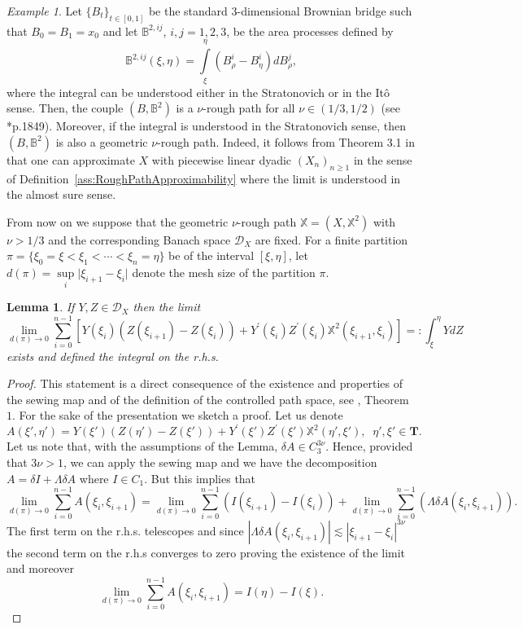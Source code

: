 \documentclass[11pt,a4paper,reqno]{amsart}%
\theoremstyle{plain}
\theoremstyle{remark}
\newtheorem{example}[theorem]{Example}
\theoremstyle{plain}
\newtheorem{lemma}[theorem]{Lemma}
\numberwithin{equation}{section}
\def\supl{\sup\limits}
\def\intl{\int\limits}
\def\supl{\mathop{\sup}\limits}
\begin{document}
\begin{example}
Let $\{B_t\}_{t\in [0,1]}$ be the standard $3$-dimensional Brownian
bridge such that $B_0=B_1=x_0$ and let $\mathbb{B}^{2,ij}$, $i,j=1,2,3$,  be the
area processes defined by
$$
\mathbb{B}^{2,ij}(\xi,\eta)=\intl_{\xi}^{\eta}(B^i_{\rho}-B^i_{\eta})dB^j_{\rho},
$$
where the integral can be understood either in the Stratonovich or in the It\^o
sense. Then, the couple $(B,\mathbb{B}^2)$ is a $\nu$-rough path for all $\nu\in(1/3,1/2)$ (see \cite{[Bess+Gub_2005]}*{p.1849}). Moreover, if the integral is understood in the Stratonovich sense,  then $(B,\mathbb{B}^2)$ is also a
geometric $\nu$-rough path.  Indeed, it follows from Theorem
3.1 in \cite{[Friz-2005]} that one can approximate $X$ with
piecewise linear dyadic $(X_n)_{n\ge 1}$ in the sense of Definition~\ref{ass:RoughPathApproximability} where the limit is understood in the almost sure sense.
\end{example}
From now on we suppose that the geometric $\nu$-rough path
$\mathbb{X}=(X,\mathbb{X}^2)$ with $\nu>1/3$ and the corresponding Banach space
$\mathcal{D}_X$ are fixed.  For a  finite
partition $\pi=\{\xi_0=\xi<\xi_1<\cdots<\xi_n=\eta\}$ be   of the interval  $[\xi,\eta]$, let  $d(\pi)=\supl_i\vert \xi_{i+1}-\xi_i\vert $ denote the mesh size of the partition $\pi$.
\begin{lemma}\label{lem:IntegralDef}
  If $Y,Z\in \mathcal{D}_X$ then the limit
\begin{equation}
\lim_{d(\pi)\to
0}\sum_{i=0}^{n-1}[Y(\xi_i)(Z(\xi_{i+1})-Z(\xi_i))+Y^\prime(\xi_i)Z^\prime(\xi_i)\mathbb{X}^2(\xi_{i+1},\xi_i)] =: \int_{\xi}^{\eta}YdZ\label{eqn:IntegralDef-1}
\end{equation}
exists and defined the integral on the r.h.s.
\end{lemma}
\begin{proof}%
This statement is a direct consequence of the existence and properties of the sewing map and of the definition of the controlled path space, see \cite{[Gubinelli-2004]}, Theorem $1$. For the sake of the presentation we sketch a proof. Let us denote
$$
A(\xi',\eta')= Y(\xi')(Z(\eta')-Z(\xi'))+Y^\prime(\xi')Z^\prime(\xi')\mathbb{X}^2(\eta',\xi'), \;\; \eta',\xi'\in\mathbf{T}.
$$
Let us note that, with the assumptions of the Lemma,  $\delta A \in C^{3\nu}_3$. Hence,  provided that $3\nu> 1$, we can apply the sewing map and we have the decomposition
$
A = \delta I +  \Lambda \delta A
$
where $I\in C_1$. But this implies that
$$
\lim_{d(\pi)\to
0}\sum_{i=0}^{n-1} A(\xi_i,\xi_{i+1}) =\lim_{d(\pi)\to
0}\sum_{i=0}^{n-1} (I(\xi_{i+1})-I(\xi_i)) +  \lim_{d(\pi)\to
0}\sum_{i=0}^{n-1} (\Lambda \delta A(\xi_i,\xi_{i+1})).
$$
The first term on the r.h.s. telescopes and since $|\Lambda \delta A(\xi_i,\xi_{i+1})| \lesssim |\xi_{i+1}-\xi_i|^{3\nu}$ the second term on the r.h.s converges to zero proving the existence of the limit and moreover 
$$
\lim_{d(\pi)\to
0}\sum_{i=0}^{n-1} A(\xi_i,\xi_{i+1}) = I(\eta)-I(\xi).
$$
\end{proof}
\end{document}
